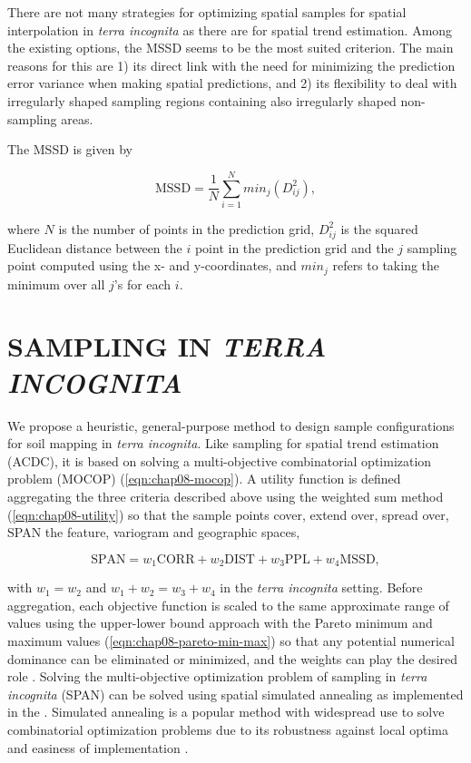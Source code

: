 There are not many strategies for optimizing spatial samples for spatial interpolation in \emph{terra 
incognita} as there are for spatial trend estimation. Among the existing options, the MSSD seems to be the most 
suited criterion. The main reasons for this are 1) its direct link with the need for minimizing the prediction 
error variance when making spatial predictions, and 2) its flexibility to deal with irregularly shaped sampling 
regions containing also irregularly shaped non-sampling areas.

The MSSD is given by

\begin{equation}%
 \text{MSSD} = \frac{1}{N} \sum_{i = 1}^{N} min_j(D_{ij}^2),
\end{equation}

\noindent where $N$ is the number of points in the prediction grid, $D_{ij}^2$ is the squared Euclidean 
distance between the $i$ point in the prediction grid and the $j$ sampling point computed using the x- and 
y-coordinates, and $min_j$ refers to taking the minimum over all $j$’s for each $i$.

\section{SAMPLING IN \emph{TERRA INCOGNITA}}

We propose a heuristic, general-purpose method to design sample configurations for soil mapping in \emph{terra 
incognita}. Like sampling for spatial trend estimation (ACDC), it is based on solving a multi-objective 
combinatorial optimization problem (MOCOP) (\autoref{eqn:chap08-mocop}). A utility function is defined 
aggregating the three criteria described above using the weighted sum method (\autoref{eqn:chap08-utility})
so that the sample points cover, extend over, spread over, SPAN the feature, variogram and geographic spaces,

\begin{equation}\label{eqn:chap08-span} %
\text{SPAN} = w_1 \text{CORR} + w_2 \text{DIST} + w_3 \text{PPL} + w_4 \text{MSSD}, 
\end{equation}

\noindent with $w_1 = w_2$ and $w_1 + w_2 = w_3 + w_4$ in the \emph{terra incognita} setting. Before 
aggregation, each objective function is scaled to the same approximate range of values using the upper-lower 
bound approach with the Pareto minimum and maximum values (\autoref{eqn:chap08-pareto-min-max}) so that any 
potential numerical dominance can be eliminated or minimized, and the weights can play the desired role 
\cite{MarlerEtAl2005, MarlerEtAl2009}. Solving the multi-objective optimization problem of sampling in 
\emph{terra incognita} (SPAN) can be solved using spatial simulated annealing as implemented in the 
. Simulated annealing is a popular method with widespread use to solve combinatorial 
optimization problems due to its robustness against local optima and easiness of implementation 
\cite{MetropolisEtAl1953, KirkpatrickEtAl1983, Cerny1985, AartsEtAl1989, Groenigen1999a}.

